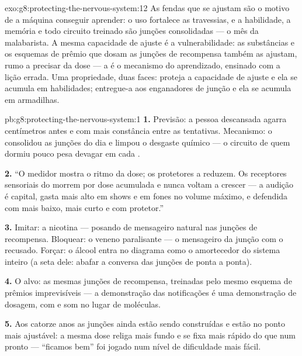 \begin{solution}{exo:g8:protecting-the-nervous-system:12}
As fendas que se ajustam são o motivo de a máquina conseguir aprender:
o uso fortalece as travessias, e a habilidade, a memória e todo
circuito treinado são junções consolidadas --- o mês da malabarista. A
mesma capacidade de ajuste é a vulnerabilidade: as substâncias e os
esquemas de prêmio que dosam as junções de recompensa também as
ajustam, rumo a precisar da dose --- a  é o mecanismo do
aprendizado, ensinado com a lição errada. Uma propriedade, duas faces:
proteja a capacidade de ajuste e ela se acumula em habilidades;
entregue-a aos enganadores de junção e ela se acumula em armadilhas.
\end{solution}

\begin{solution}{pb:g8:protecting-the-nervous-system:1}
\textbf{1.} Previsão: a pessoa descansada agarra centímetros antes e
com mais constância entre as tentativas. Mecanismo: o  consolidou
as junções do dia e limpou o desgaste químico --- o circuito de quem
dormiu pouco pesa devagar em cada .

\textbf{2.} ``O medidor mostra o ritmo da dose; os protetores a
reduzem. Os receptores sensoriais do  morrem por dose acumulada
e nunca voltam a crescer --- a audição é capital, gasta mais alto em
shows e em fones no volume máximo, e defendida com mais baixo, mais
curto e com protetor.''

\textbf{3.} Imitar: a nicotina --- posando de mensageiro natural nas
junções de recompensa. Bloquear: o veneno paralisante --- o mensageiro
da junção com o  recusado. Forçar: o álcool entra no diagrama
como o amortecedor do sistema inteiro (a seta dele: abafar a conversa
das junções de ponta a ponta).

\textbf{4.} O alvo: as mesmas junções de recompensa, treinadas pelo
mesmo esquema de prêmios imprevisíveis --- a demonstração das
notificações é uma demonstração de dosagem, com  e som no lugar de
moléculas.

\textbf{5.} Aos catorze anos as junções ainda estão sendo construídas
e estão no ponto mais ajustável: a mesma dose religa mais fundo e se
fixa mais rápido do que num  pronto --- ``ficamos bem'' foi
jogado num nível de dificuldade mais fácil.


\end{solution}
